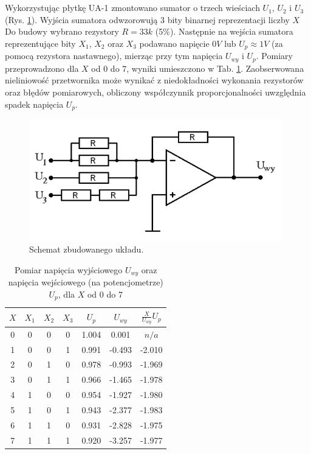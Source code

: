 \section{}
Wykorzystując płytkę UA-1 zmontowano sumator o trzech wieściach \(U_1\), \(U_2\) i \(U_3\) (Rys. \ref{sh2}). Wyjścia sumatora odwzorowują 3 bity binarnej reprezentacji liczby \(X\)
Do budowy wybrano rezystory \(R=33k\) (5\%).
Następnie na wejścia sumatora reprezentujące bity \(X_1\), \(X_2\) oraz \(X_3\) podawano napięcie \(0V\) lub \(U_p\approx1V\) (za pomocą rezystora nastawnego), mierząc przy tym napięcia \(U_{wy}\) i \(U_p\).
Pomiary przeprowadzono dla \(X\) od 0 do 7, wyniki umieszczono w Tab. \ref{tab1}.
Zaobserwowana nieliniowość przetwornika może wynikać z niedokładności wykonania rezystorów oraz błędów pomiarowych, obliczony współczynnik proporcjonalności uwzględnia spadek napięcia \(U_p\).

\begin{figure}[H]
	\centering
	\includegraphics[width=11cm]{include/2/1.png}
	\caption{Schemat zbudowanego układu.}
	\label{sh2}
\end{figure}

\begin{table}[H]
	\centering
	\begin{tabular}{c|c c c|c||c|c}
		\hline
		\(X\) & \(X_1\) & \(X_2\) & \(X_3\) & \(U_p\) & \(U_{wy}\) & \(\frac{X}{U_{wy}} U_p\) \\ \hline\hline
		0     & 0       & 0       & 0       & 1.004   & 0.001      & \(n/a\)                  \\ \hline
		1     & 0       & 0       & 1       & 0.991   & -0.493     & -2.010                   \\ \hline
		2     & 0       & 1       & 0       & 0.978   & -0.993     & -1.969                   \\ \hline
		3     & 0       & 1       & 1       & 0.966   & -1.465     & -1.978                   \\ \hline
		4     & 1       & 0       & 0       & 0.954   & -1.927     & -1.980                   \\ \hline
		5     & 1       & 0       & 1       & 0.943   & -2.377     & -1.983                   \\ \hline
		6     & 1       & 1       & 0       & 0.931   & -2.828     & -1.975                   \\ \hline
		7     & 1       & 1       & 1       & 0.920   & -3.257     & -1.977                   \\ \hline
	\end{tabular}
	\caption{Pomiar napięcia wyjściowego \(U_{wy}\) oraz napięcia wejściowego (na potencjometrze) \(U_p\), dla \(X\) od 0 do 7}
	\label{tab1}
\end{table}
